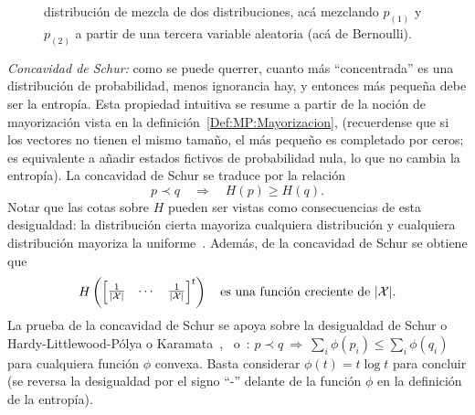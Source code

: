 \begin{propiedades}
\begin{figure}[h!]
{  distribuci\'on de  mezcla de dos  distribuciones, ac\'a mezclando  $p_{(1)}$ y
  $p_{(2)}$ a partir de una tercera variable aleatoria (ac\'a de Bernoulli).}
  \label{Fig:SZ:Concavidad}
  \end{figure}
%
\setcounter{PropSchurConcavidad}{\value{enumi}}
\item\label{Prop:SZ:Schurconcavidad}  {\it Concavidad de Schur:}  como se  puede
  querrer, cuanto  m\'as ``concentrada'' es una  distribuci\'on de probabilidad,
  menos ignorancia hay, y entonces m\'as peque\~na debe ser la entrop\'ia.  Esta
  propiedad intuitiva se resume a partir  de la noci\'on de mayorizaci\'on vista
  en la definici\'on~\ref{Def:MP:Mayorizacion},
  (recuerdense  que si  los  vectores  no tienen  el  mismo  tama\~no, el  m\'as
  peque\~no es completado por ceros;  es equivalente a a\~nadir estados fictivos
  de probabilidad nula, lo que no cambia la entrop\'ia).
  La  concavidad de Schur  se  traduce  por  la  relaci\'on
  \[
  p \prec  q \quad \Rightarrow  \quad H(p) \ge  H(q).
  \]
  Notar que  las cotas sobre  $H$ pueden ser  vistas como consecuencias  de esta
  desigualdad:  la distribuci\'on  cierta mayoriza  cualquiera distribuci\'on  y
  cualquiera distribuci\'on mayoriza la uniforme~\cite[p.~9, (6)-(8)]{MarOlk11}.
  Adem\'as, de la concavidad de Schur se obtiene que
  \[
  H\left( \begin{bmatrix}  \frac{1}{|\mathcal{X}|} & \cdots  & \frac{1}{|\mathcal{X}|} \end{bmatrix}^t
  \right) \quad \mbox{es una funci\'on creciente de } |\mathcal{X}|.
  \]
  La prueba de la  concavidad de Schur se apoya sobre la  desigualdad de Schur o
  Hardy-Littlewood-P\'olya    o     Karamata~\cite{Sch23,    HarLit29,    Kar32,
  HarLit52},~\cite[Cap.~3,  Prop.~C.1]{MarOlk11} o~\cite[Teorema~II.3.1]{Bha97}:
  $p  \prec q  \: \Rightarrow  \: \sum_i  \phi(p_i) \le  \sum_i \phi(q_i)$  para
  cualquiera funci\'on  $\phi$ convexa.  Basta  considerar $\phi(t) = t  \log t$
  para concluir  (se reversa  la desigualdad  por el signo  ``-'' delante  de la
  funci\'on $\phi$ en la definici\'on de la entrop\'ia).
\end{propiedades}
%


